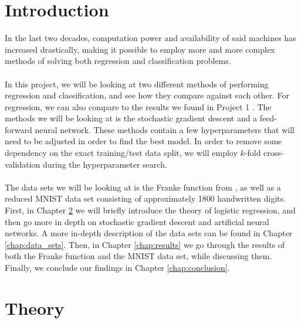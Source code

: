 \documentclass[a4paper]{article}
\newcommand\red[1]{\textcolor{red}{\textbf{#1}}}
\begin{document}
\section{Introduction}
In the last two decades, computation power and availability of said machines has increased drastically, making it possible to employ more and more complex methods of solving both regression and classification problems.
\\\\
In this project, we will be looking at two different methods of performing regression and classification, and see how they compare against each other. For regression, we can also compare to the results we found in Project 1 \cite{Github1}. The methods we will be looking at is the stochastic gradient descent and a feed-forward neural network. These methods contain a few hyperparameters that will need to be adjusted in order to find the best model. In order to remove some dependency on the exact training/test data split, we will employ $k$-fold cross-validation during the hyperparameter search.
\\\\
The data sets we will be looking at is the Franke function from \cite{Franke}, as well as a reduced MNIST data set \cite{MNIST} consisting of approximately 1800 handwritten digits.
First, in Chapter \ref{chap:theory} we will briefly introduce the theory of logistic regression, and then go more in depth on stochastic gradient descent and artificial neural networks. A more in-depth description of the data sets can be found in Chapter \ref{chap:data_sets}. Then, in Chapter \ref{chap:results} we go through the results of both the Franke function and the MNIST data set, while discussing them.
Finally, we conclude our findings in Chapter \ref{chap:conclusion}.


\section{Theory} \label{chap:theory}
\end{document}

